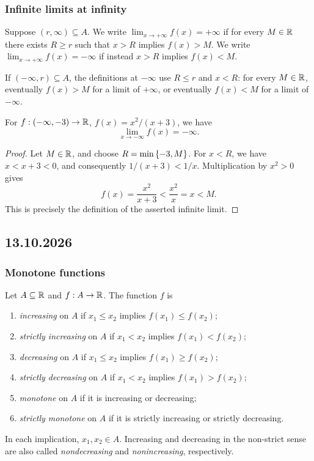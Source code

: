 \documentclass[11pt,a4paper]{amsart}
\begin{document}
\subsubsection{Infinite limits at infinity}

\begin{definition}
  Suppose \((r,\infty)\subseteq A\). We write
  \(\lim_{x\to+\infty}f(x)=+\infty\) if for every \(M\in\mathbb{R}\)
  there exists \(R\geq r\) such that \(x>R\) implies \(f(x)>M\).
  We write \(\lim_{x\to+\infty}f(x)=-\infty\) if instead
  \(x>R\) implies \(f(x)<M\).

  If \((-\infty,r)\subseteq A\), the definitions at \(-\infty\)
  use \(R\leq r\) and \(x<R\): for every \(M\in\mathbb{R}\),
  eventually \(f(x)>M\) for a limit of \(+\infty\), or
  eventually \(f(x)<M\) for a limit of \(-\infty\).
\end{definition}

\begin{example}
  For \(f:(-\infty,-3)\to\mathbb{R}\), \(f(x)=x^2/(x+3)\), we have
  \[
    \lim_{x\to-\infty}f(x)=-\infty.
  \]
\end{example}

\begin{proof}
  Let \(M\in\mathbb{R}\), and choose \(R=\min\left\lbrace-3,M\right\rbrace\).
  For \(x<R\), we have \(x<x+3<0\), and consequently
  \(1/(x+3)<1/x\). Multiplication by \(x^2>0\) gives
  \[
    f(x)=\frac{x^2}{x+3}<\frac{x^2}{x}=x<M.
  \]
  This is precisely the definition of the asserted infinite limit.
\end{proof}

\subsection{13.10.2026}

\subsubsection{Monotone functions}

\begin{definition}
  Let \(A\subseteq\mathbb{R}\) and \(f:A\to\mathbb{R}\). The function \(f\) is
  \begin{enumerate}[label=(\alph*)]
    \item \emph{increasing} on \(A\) if
      \(x_1\leq x_2\) implies \(f(x_1)\leq f(x_2)\);
    \item \emph{strictly increasing} on \(A\) if
      \(x_1<x_2\) implies \(f(x_1)<f(x_2)\);
    \item \emph{decreasing} on \(A\) if
      \(x_1\leq x_2\) implies \(f(x_1)\geq f(x_2)\);
    \item \emph{strictly decreasing} on \(A\) if
      \(x_1<x_2\) implies \(f(x_1)>f(x_2)\);
    \item \emph{monotone} on \(A\) if it is increasing or decreasing;
    \item \emph{strictly monotone} on \(A\) if it is strictly increasing
      or strictly decreasing.
  \end{enumerate}
  In each implication, \(x_1,x_2\in A\). Increasing and decreasing
  in the non-strict sense are also called \emph{nondecreasing} and
  \emph{nonincreasing}, respectively.
\end{definition}
\end{document}
